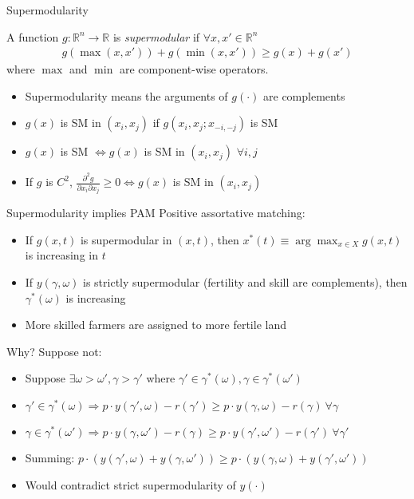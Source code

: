 \documentclass[10pt,notes=hide]{beamer}
\begin{document}
\begin{frame}{Supermodularity}
\begin{definition}[Supermodularity]
A function $g:\mathbb{R}^n\to\mathbb{R}$ is \emph{supermodular} if $\forall x,x'\in\mathbb{R}^n$
\begin{align*}
g\left(\max\left(x,x'\right)\right) + g\left(\min\left(x,x'\right)\right)\geq g(x) + g(x')
\end{align*}
where $\max$ and $\min$ are component-wise operators.
\end{definition}
\begin{itemize}
	\item Supermodularity means the arguments of $g(\cdot)$ are complements
	\item $g(x)$ is SM in $(x_i,x_j)$ if $g(x_i,x_j;x_{-i,-j})$ is SM 
	\item $g(x)$ is SM $\iff g(x)$ is SM in $(x_i,x_j)$  $\forall i,j$
	\item If $g$ is $C^2$, $\frac{\partial^2 g}{\partial x_i \partial x_j}\geq 0 \iff g(x)$ is SM in $(x_i,x_j)$
\end{itemize}
\end{frame}
\begin{frame}{Supermodularity implies PAM}
Positive assortative matching:
\begin{itemize}
	\item If $g(x,t)$ is supermodular in $(x,t)$, then $x^{*}(t)\equiv \arg\max_{x\in X} g(x,t)$ is increasing in $t$
	\item If $y(\gamma,\omega)$ is strictly supermodular (fertility and skill are complements), then $\gamma^{*}(\omega)$ is increasing
	\item More skilled farmers are assigned to more fertile land
\end{itemize}
Why? Suppose not:
\begin{itemize}
	\item Suppose $\exists \omega > \omega', \gamma>\gamma'$ where $\gamma' \in \gamma^{*}(\omega), \gamma \in \gamma^{*}(\omega')$
	\item $\gamma' \in \gamma^{*}(\omega) \Rightarrow p\cdot y(\gamma',\omega) - r(\gamma') \geq p\cdot y(\gamma,\omega) - r(\gamma) \ \forall \gamma$
	\item $\gamma \in \gamma^{*}(\omega') \Rightarrow p\cdot y(\gamma,\omega') - r(\gamma) \geq p\cdot y(\gamma',\omega') - r(\gamma') \ \forall \gamma'$
	\item Summing: $p \cdot \left( y(\gamma',\omega) + y(\gamma,\omega') \right) \geq p\cdot \left(y(\gamma,\omega) + y(\gamma',\omega') \right)$
	\item Would contradict strict supermodularity of $y(\cdot)$
\end{itemize}
\end{frame}
\end{document}
